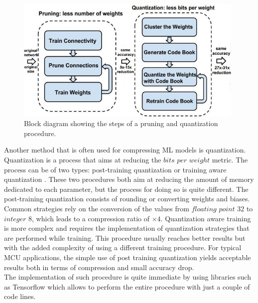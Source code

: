\documentclass[12pt]{report}
\begin{document}
\begin{figure}[h!]
    \centering
    \includegraphics[width=110mm]{Figures/Chapter1/pruning.jpg} 
    \caption{Block diagram showing the steps of a pruning and quantization procedure.}
    \label{fig:pruning}    
\end{figure}  

Another method that is often used for compressing ML models is quantization. Quantization is a process that aims at reducing the $bits$ $per$ $weight$ metric. The process can be of two types: post-training quantization or training aware quantization \cite{pruning_article}. These two procedures both aim at reducing the amount of memory dedicated to each parameter, but the process for doing so is quite different. The post-training quantization consists of rounding or converting weights and biases. Common strategies rely on the conversion of the values from $floating$ $point$ 32 to $integer$ 8, which leads to a compression ratio of $\times 4$. Quantization aware training is more complex and requires the implementation of quantization strategies that are performed while training. This procedure usually reaches better results but with the added complexity of using a different training procedure. For typical MCU applications, the simple use of post training quantization yields acceptable results both in terms of compression and small accuracy drop. \\
The implementation of such procedure is quite immediate by using libraries such as Tensorflow \cite{tensorflow_quantization} which allows to perform the entire procedure with just a couple of code lines.
\end{document}
